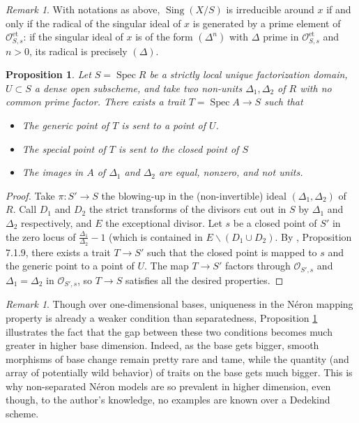 \documentclass[a4paper,12pt]{amsart} %
\numberwithin{equation}{subsection}
\newcommand{\on}[1]{\operatorname{#1}}
\def\Sing{\operatorname{Sing}}
\newcommand{\Spec}{\operatorname{Spec}}
\theoremstyle{definition}
\theoremstyle{plain}%
\newtheorem{proposition}[definition]{Proposition}
\theoremstyle{remark}
\newtheorem{remark}[definition]{Remark}
\renewcommand{\O}{\mathcal{O}}
\begin{document}
\begin{remark}\label{remark:sing_irr_around_x_iff_label_is_a_prime_power}
With notations as above, $\Sing(X/S)$ is irreducible around $x$ if and only if the radical of the singular ideal of $x$ is generated by a prime element of $\O_{S,s}^{\on{et}}$: if the singular ideal of $x$ is of the form $(\Delta^n)$ with $\Delta$ prime in $\O_{S,s}^{\on{et}}$ and $n>0$, its radical is precisely $(\Delta)$.
\end{remark}


\begin{proposition}\label{proposition existence du trait qui rend egaux 2 elements premiers entre eux}
	Let $S=\Spec R$ be a strictly local unique factorization domain, $U\subset S$ a dense open subscheme, and take two non-units $\Delta_1,\Delta_2$ of $R$ with no common prime factor. There exists a trait $T=\Spec A\to S$ such that
	\begin{itemize}
	\item The generic point of $T$ is sent to a point of $U$.
	\item The special point of $T$ is sent to the closed point of $S$
	\item The images in $A$ of $\Delta_1$ and $\Delta_2$ are equal, nonzero, and not units.
	\end{itemize}
\end{proposition}


\begin{proof}
Take $\pi:S'\to S$ the blowing-up in the (non-invertible) ideal $(\Delta_1,\Delta_2)$ of $R$. Call $D_1$ and $D_2$ the strict transforms of the divisors cut out in $S$ by $\Delta_1$ and $\Delta_2$ respectively, and $E$ the exceptional divisor. Let $s$ be a closed point of $S'$ in the zero locus of $\frac{\Delta_1}{\Delta_2}-1$ (which is contained in $E\backslash(D_1\cup D_2)$. By \cite{EGA2}, Proposition 7.1.9, there exists a trait $T\to S'$ such that the closed point is mapped to $s$ and the generic point to a point of $U$. The map $T\to S'$ factors through $\O_{S',s}$ and $\Delta_1=\Delta_2$ in $\O_{S',s}$, so $T\to S$ satisfies all the desired properties.
\end{proof}


\begin{remark}
Though over one-dimensional bases, uniqueness in the N\'eron mapping property is already a weaker condition than separatedness, Proposition \ref{proposition existence du trait qui rend egaux 2 elements premiers entre eux} illustrates the fact that the gap between these two conditions becomes much greater in higher base dimension. Indeed, as the base gets bigger, smooth morphisms of base change remain pretty rare and tame, while the quantity (and array of potentially wild behavior) of traits on the base gets much bigger. This is why non-separated N\'eron models are so prevalent in higher dimension, even though, to the author's knowledge, no examples are known over a Dedekind scheme. 
\end{remark}
\end{document}
